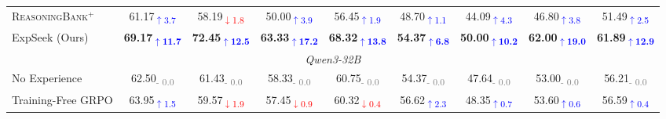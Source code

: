 \begin{table}[!ht]
\begin{tabular*}{0.97\textwidth}{@{\extracolsep{\fill}}l cccc ccc c@{}}
    \textsc{ReasoningBank}$^+$ & 61.17\textsubscript{\textcolor{blue}{$\uparrow$3.7}} & 58.19\textsubscript{\textcolor{red}{$\downarrow$1.8}} & 50.00\textsubscript{\textcolor{blue}{$\uparrow$3.9}} & 56.45\textsubscript{\textcolor{blue}{$\uparrow$1.9}} & 48.70\textsubscript{\textcolor{blue}{$\uparrow$1.1}} & 44.09\textsubscript{\textcolor{blue}{$\uparrow$4.3}} & 46.80\textsubscript{\textcolor{blue}{$\uparrow$3.8}} & 51.49\textsubscript{\textcolor{blue}{$\uparrow$2.5}} \\

    ExpSeek (Ours) & \textbf{69.17}\textsubscript{\textbf{\textcolor{blue}{$\uparrow$11.7}}} & \textbf{72.45}\textsubscript{\textbf{\textcolor{blue}{$\uparrow$12.5}}} & \textbf{63.33}\textsubscript{\textbf{\textcolor{blue}{$\uparrow$17.2}}} & \textbf{68.32}\textsubscript{\textbf{\textcolor{blue}{$\uparrow$13.8}}} & \textbf{54.37}\textsubscript{\textbf{\textcolor{blue}{$\uparrow$6.8}}} & \textbf{50.00}\textsubscript{\textbf{\textcolor{blue}{$\uparrow$10.2}}} & \textbf{62.00}\textsubscript{\textbf{\textcolor{blue}{$\uparrow$19.0}}} & \textbf{61.89}\textsubscript{\textbf{\textcolor{blue}{$\uparrow$12.9}}} \\


    \midrule
    \multicolumn{9}{c}{\cellcolor{gray!15}\textit{Qwen3-32B}} \\

    No Experience & 62.50\textsubscript{\textcolor{gray}{- 0.0}} & 61.43\textsubscript{\textcolor{gray}{- 0.0}} & 58.33\textsubscript{\textcolor{gray}{- 0.0}} & 60.75\textsubscript{\textcolor{gray}{- 0.0}} & 54.37\textsubscript{\textcolor{gray}{- 0.0}} & 47.64\textsubscript{\textcolor{gray}{- 0.0}} & 53.00\textsubscript{\textcolor{gray}{- 0.0}} & 56.21\textsubscript{\textcolor{gray}{- 0.0}} \\

    Training-Free GRPO & 63.95\textsubscript{\textcolor{blue}{$\uparrow$1.5}} & 59.57\textsubscript{\textcolor{red}{$\downarrow$1.9}} & 57.45\textsubscript{\textcolor{red}{$\downarrow$0.9}} & 60.32\textsubscript{\textcolor{red}{$\downarrow$0.4}} & 56.62\textsubscript{\textcolor{blue}{$\uparrow$2.3}} & 48.35\textsubscript{\textcolor{blue}{$\uparrow$0.7}} & 53.60\textsubscript{\textcolor{blue}{$\uparrow$0.6}} & 56.59\textsubscript{\textcolor{blue}{$\uparrow$0.4}} \\


\end{tabular*}
\end{table}
